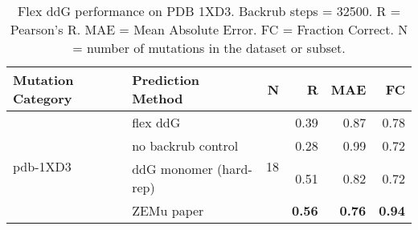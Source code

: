 \begin{table}
  \begin{tabular}{llrrrr}
\toprule
Mutation Category &       Prediction Method &   N &    R &  MAE &   FC \\
\midrule
 \multirow{ 4}{*}{pdb-1XD3} & flex ddG & \multirow{ 4}{*}{18} & 0.39 & 0.87 & 0.78  \\
 & no backrub control & & 0.28 & 0.99 & 0.72  \\
 & ddG monomer (hard-rep) & & 0.51 & 0.82 & 0.72  \\
 & ZEMu paper & & \textbf{0.56} & \textbf{0.76} & \textbf{0.94}  \\
\bottomrule
\end{tabular}
  \caption[Flex ddG performance on PDB 1XD3]{
    Flex ddG performance on PDB 1XD3. Backrub steps = 32500. R = Pearson's R. MAE = Mean Absolute Error. FC = Fraction Correct. N = number of mutations in the dataset or subset.
  } \label{tab:table-pdb-1XD3}
\end{table}
